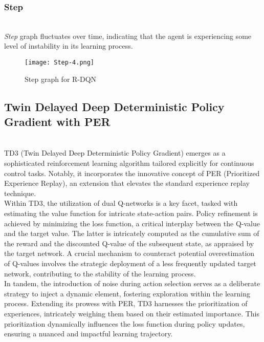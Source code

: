 \documentclass[preprint,12pt]{elsarticle}
\begin{document}
\subsubsection{Step}\\
\textit{Step} graph fluctuates over time, indicating that the agent is experiencing some level of instability in its learning process.
\graphicspath{ {./images/} }
\begin{figure}[!htbp]
  \centering
  \texttt{[image: Step-4.png]}
  \caption{Step graph for R-DQN}
  \label{fig:step-4}
\end{figure}


\subsection{Twin Delayed Deep Deterministic Policy Gradient with PER}\\

TD3 (Twin Delayed Deep Deterministic Policy Gradient) emerges as a sophisticated reinforcement learning algorithm tailored explicitly for continuous control tasks. Notably, it incorporates the innovative concept of PER (Prioritized Experience Replay), an extension that elevates the standard experience replay technique.\\

Within TD3, the utilization of dual Q-networks is a key facet, tasked with estimating the value function for intricate state-action pairs. Policy refinement is achieved by minimizing the loss function, a critical interplay between the Q-value and the target value. The latter is intricately computed as the cumulative sum of the reward and the discounted Q-value of the subsequent state, as appraised by the target network. A crucial mechanism to counteract potential overestimation of Q-values involves the strategic deployment of a less frequently updated target network, contributing to the stability of the learning process.\\

In tandem, the introduction of noise during action selection serves as a deliberate strategy to inject a dynamic element, fostering exploration within the learning process. Extending its prowess with PER, TD3 harnesses the prioritization of experiences, intricately weighing them based on their estimated importance. This prioritization dynamically influences the loss function during policy updates, ensuring a nuanced and impactful learning trajectory.\\
\end{document}
